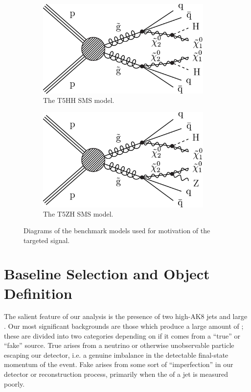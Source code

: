 \begin{figure}
\centering
\begin{subfigure}[b]{0.425\textwidth}
\includegraphics[width=0.95\textwidth]{figs/CMS-SUS-17-006_Figure_001.pdf}
\caption{The T5HH SMS model.}
\label{fig:t5hh}
\end{subfigure}
\begin{subfigure}[b]{0.425\textwidth}
\includegraphics[width=0.95\textwidth]{figs/CMS-SUS-17-006_Figure-aux_001.pdf}
\caption{The T5ZH SMS model.}
\label{fig:t5zh}
\end{subfigure}
\caption{Diagrams of the benchmark models used for motivation of the targeted signal.}
\label{fig:sms}
\end{figure}

\section{Baseline Selection and Object Definition}
\label{sec:baseline}

The salient feature of our analysis is the presence of two high-\pt AK8 jets and large \ptmiss. Our most significant backgrounds are those which produce a large amount of \ptmiss; these are divided into two categories depending on if it comes from a ``true'' or ``fake'' source. True \ptmiss arises from a neutrino or otherwise unobservable particle escaping our detector, i.e. a genuine imbalance in the detectable final-state momentum of the event. Fake \ptmiss arises from some sort of ``imperfection'' in our detector or reconstruction process, primarily when the \pt of a jet is measured poorly.

